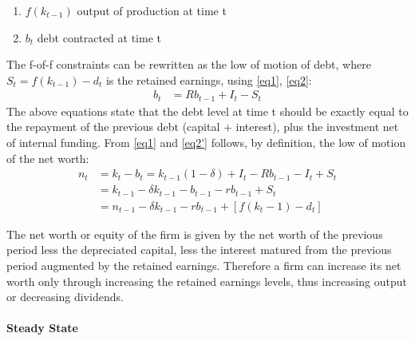 \documentclass[12pt]{article}
\begin{document}
\begin{enumerate}
    \item \(f(k_{t-1}) \) output of production at time t
    \item  \(b_t\) debt contracted at time t
\end{enumerate}
The f-of-f constraints can be rewritten as the low of motion of debt, where \(S_t = f(k_{t-1}) - d_t\) is the retained
earnings, using \ref{eq1}, \ref{eq2}:
\begin{align*} 
    b_t &= R b_{t-1} + I_t - S_t  \label{eq2'}
\end{align*} 
The above equations state that the debt level at time t should be exactly equal to the repayment of the previous debt (capital +
interest), plus the investment net of internal funding. 
From \ref{eq1} and \ref{eq2'} follows, by definition, the low of motion of the net worth:
\begin{align*}
    n_t & = k_t- b_t = k_{t-1}(1-\delta) + I_t - R b_{t-1} - I_t + S_t \\
    &= k_{t-1} - \delta k_{t-1} - b_{t-1} - r b_{t-1}+ S_t \\
    &= n_{t-1} - \delta k_{t-1} - r b_{t-1} + \left[f\left({k_t-1}\right) - d_t \right]
\end{align*}

The net worth or equity of the firm is given by the net worth of the previous period less the depreciated capital, less
the interest matured from the previous period augmented by the retained earnings. Therefore a firm can increase its
net worth only through increasing the retained earnings levels, thus increasing output or decreasing dividends.

\paragraph{Steady State}
\end{document}
